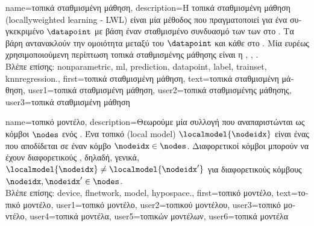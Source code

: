 {name={\foreignlanguage{greek}{τοπικά σταθμισμένη μάθηση}},
	description={\foreignlanguage{greek}{Η τοπικά σταθμισμένη μάθηση} 
		(locally\linebreak weighted learning - LWL) \foreignlanguage{greek}{είναι μία}  \foreignlanguage{greek}{μέθοδος} 
		 \foreignlanguage{greek}{που πραγματοποιεί}  \foreignlanguage{greek}{για ένα συγκεκριμένο} 
		 $\datapoint$ \foreignlanguage{greek}{με βάση έναν σταθμισμένο συνδυασμό των}  
		\foreignlanguage{greek}{των}  \foreignlanguage{greek}{στο} . 
		\foreignlanguage{greek}{Τα βάρη αντανακλούν την ομοιότητα μεταξύ του}  $\datapoint$ \foreignlanguage{greek}{και 
		κάθε}  \foreignlanguage{greek}{στο} . \foreignlanguage{greek}{Μία ευρέως χρησιμοποιούμενη 
		περίπτωση τοπικά σταθμισμένης μάθησης είναι η}  \cite{MLBasics}, \cite{BishopBook}, \cite{LocallyWeightedLearning}.
				\\
		\foreignlanguage{greek}{Βλέπε επίσης:} \gls{nonparametric}, \gls{ml}, \gls{prediction}, \gls{datapoint}, \gls{label}, \gls{trainset}, \gls{knnregression}.}, 
	first={\foreignlanguage{greek}{τοπικά σταθμισμένη μάθηση}},
	text={\foreignlanguage{greek}{τοπικά σταθμισμένη μάθηση}},
	user1={\foreignlanguage{greek}{τοπικά σταθμισμένη μάθηση}}, %
	user2={\foreignlanguage{greek}{τοπικά σταθμισμένης μάθησης}}, %
	user3={\foreignlanguage{greek}{τοπικά σταθμισμένη μάθηση}} %
}

{name={\foreignlanguage{greek}{τοπικό μοντέλο}},
	description={\foreignlanguage{greek}{Θεωρούμε μία συλλογή}  
		\foreignlanguage{greek}{που αναπαριστώνται ως κόμβοι $\nodes$ ενός} . \foreignlanguage{greek}{Ένα τοπικό} 
		 (local model) $\localmodel{\nodeidx}$ \foreignlanguage{greek}{είναι ένας}  
		\foreignlanguage{greek}{που αποδίδεται σε έναν κόμβο $\nodeidx \in \nodes$. 
		Διαφορετικοί κόμβοι μπορούν να έχουν διαφορετικούς} , \foreignlanguage{greek}{δηλαδή, γενικά, 
		$\localmodel{\nodeidx} \neq \localmodel{\nodeidx'}$ για διαφορετικούς κόμβους} $\nodeidx, \nodeidx' \in \nodes$.
		\\
		\foreignlanguage{greek}{Βλέπε επίσης:} \gls{device}, \gls{flnetwork}, \gls{model}, \gls{hypospace}.},
		first={\foreignlanguage{greek}{τοπικό μοντέλο}},
		text={\foreignlanguage{greek}{τοπικό μοντέλο}},
		user1={\foreignlanguage{greek}{τοπικό μοντέλο}}, %
		user2={\foreignlanguage{greek}{τοπικού μοντέλου}}, %
		user3={\foreignlanguage{greek}{τοπικό μοντέλο}}, %
		user4={\foreignlanguage{greek}{τοπικά μοντέλα}}, %
		user5={\foreignlanguage{greek}{τοπικών μοντέλων}}, %
		user6={\foreignlanguage{greek}{τοπικά μοντέλα}} %
}

